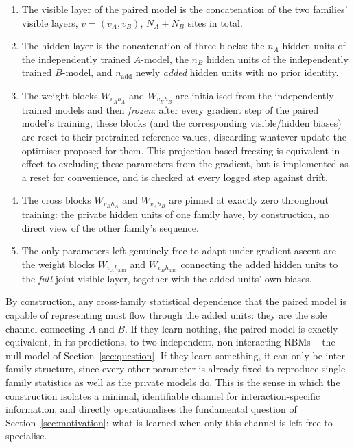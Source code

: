 \documentclass[11pt]{article}
\begin{document}
\begin{enumerate}
\item The visible layer of the paired model is the concatenation of the
two families' visible layers, $v=(v_A,v_B)$, $N_A+N_B$ sites in total.
\item The hidden layer is the concatenation of three blocks: the $n_A$
hidden units of the independently trained $A$-model, the $n_B$ hidden
units of the independently trained $B$-model, and $n_{\mathrm{add}}$
newly \emph{added} hidden units with no prior identity.
\item The weight blocks $W_{v_A h_A}$ and $W_{v_B h_B}$ are initialised
from the independently trained models and then \emph{frozen}: after
every gradient step of the paired model's training, these blocks (and the
corresponding visible/hidden biases) are reset to their pretrained
reference values, discarding whatever update the optimiser proposed for
them. This projection-based freezing is equivalent in effect to excluding
these parameters from the gradient, but is implemented as a reset for
convenience, and is checked at every logged step against drift.
\item The cross blocks $W_{v_B h_A}$ and $W_{v_A h_B}$ are pinned at
exactly zero throughout training: the private hidden units of one family
have, by construction, no direct view of the other family's sequence.
\item The only parameters left genuinely free to adapt under gradient
ascent are the weight blocks $W_{v_A h_{\mathrm{add}}}$ and
$W_{v_B h_{\mathrm{add}}}$ connecting the added hidden units to the
\emph{full} joint visible layer, together with the added units' own
biases.
\end{enumerate}

By construction, any cross-family statistical dependence that the paired
model is capable of representing must flow through the added units: they
are the sole channel connecting $A$ and $B$. If they learn nothing, the
paired model is exactly equivalent, in its predictions, to two
independent, non-interacting RBMs -- the null model of
Section~\ref{sec:question}. If they learn something, it can only be
inter-family structure, since every other parameter is already fixed to
reproduce single-family statistics as well as the private models do. This
is the sense in which the construction isolates a minimal, identifiable
channel for interaction-specific information, and directly operationalises
the fundamental question of Section~\ref{sec:motivation}: what is learned
when only this channel is left free to specialise.
\end{document}
